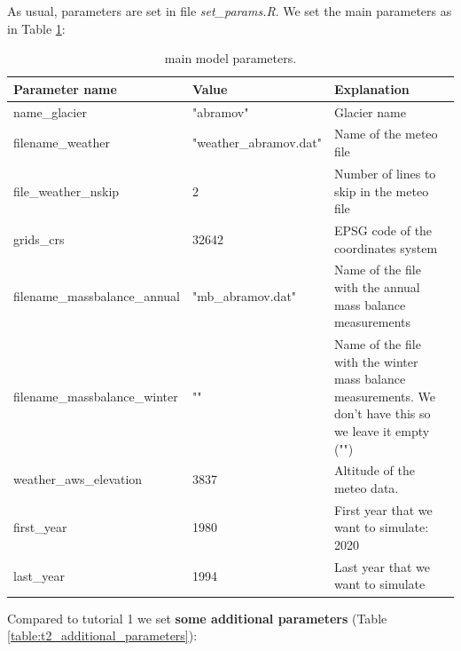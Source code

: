 \documentclass[15pt]{extarticle}
\begin{document}
As usual, parameters are set in file \textit{set\_params.R}. We set the main parameters as in Table \ref{table:t1_main_parameters}:

\begin{table}[h!]
\caption{main model parameters.}
\label{table:t1_main_parameters}
\centering
\begin{tabularx}{\textwidth}{|l l X|} 
 \hline
 \textbf{Parameter name} & \textbf{Value} & \textbf{Explanation} \\ [0.5ex] 
 \hline
 name\_glacier & "abramov" & Glacier name \\ 
 \hline
 filename\_weather & "weather\_abramov.dat" & Name of the meteo file \\
 \hline
 file\_weather\_nskip & 2 & Number of lines to skip in the meteo file \\
 \hline
 grids\_crs & 32642 & EPSG code of the coordinates system \\
 \hline
 filename\_massbalance\_annual & "mb\_abramov.dat" & Name of the file with the annual mass balance measurements\\
 \hline
 filename\_massbalance\_winter & "" & Name of the file with the winter mass balance measurements. We don't have this so we leave it empty ("")\\
 \hline
 weather\_aws\_elevation & 3837 & Altitude of the meteo data.\\
 \hline
 first\_year & 1980 & First year that we want to simulate: 2020\\
 \hline
 last\_year & 1994 & Last year that we want to simulate\\
 \hline
\end{tabularx}
\end{table}

Compared to tutorial 1 we set \textbf{some additional parameters} (Table \ref{table:t2_additional_parameters}):
\end{document}
